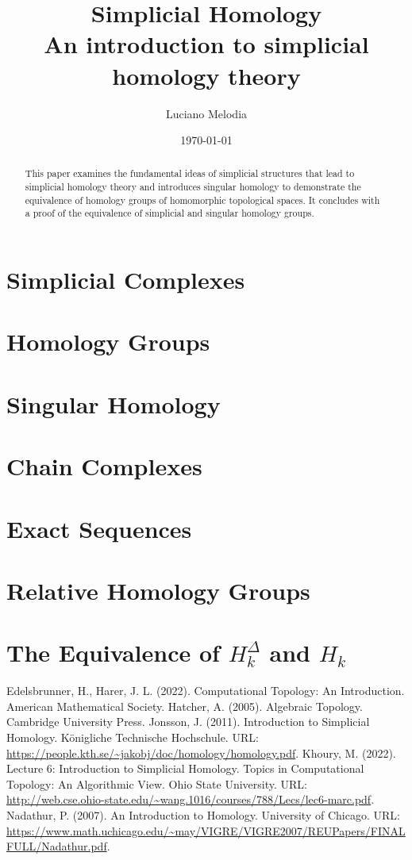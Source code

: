 \documentclass{article}
\title{\textbf{Simplicial Homology} \\[0.2cm] \large An introduction to simplicial homology theory}
\author{Luciano Melodia}
\date{\today}
\begin{document}
\maketitle
\begin{abstract}
This paper examines the fundamental ideas of simplicial structures that lead to simplicial homology theory and introduces singular homology to demonstrate the equivalence of homology groups of homomorphic topological spaces. It concludes with a proof of the equivalence of simplicial and singular homology groups.
\end{abstract}
\tableofcontents

\section{Simplicial Complexes}
\section{Homology Groups}
\section{Singular Homology}
\section{Chain Complexes}
\section{Exact Sequences}
\section{Relative Homology Groups}
\section{The Equivalence of $H_k^\Delta$ and $H_k$}


\begin{thebibliography}{100}
 Edelsbrunner, H., Harer, J. L. (2022). Computational Topology: An Introduction. American Mathematical Society.
 Hatcher, A. (2005). Algebraic Topology. Cambridge University Press.
 Jonsson, J. (2011). Introduction to Simplicial Homology. Königliche Technische Hochschule. URL: \url{https://people.kth.se/\~jakobj/doc/homology/homology.pdf}.
 Khoury, M. (2022). Lecture 6: Introduction to Simplicial Homology. Topics in Computational Topology: An Algorithmic View. Ohio State University. URL: \url{http://web.cse.ohio-state.edu/\~wang.1016/courses/788/Lecs/lec6-marc.pdf}.
 Nadathur, P. (2007). An Introduction to Homology. University of Chicago. URL: \url{https://www.math.uchicago.edu/\~may/VIGRE/VIGRE2007/REUPapers/FINALFULL/Nadathur.pdf}.

\end{thebibliography}
\end{document}
